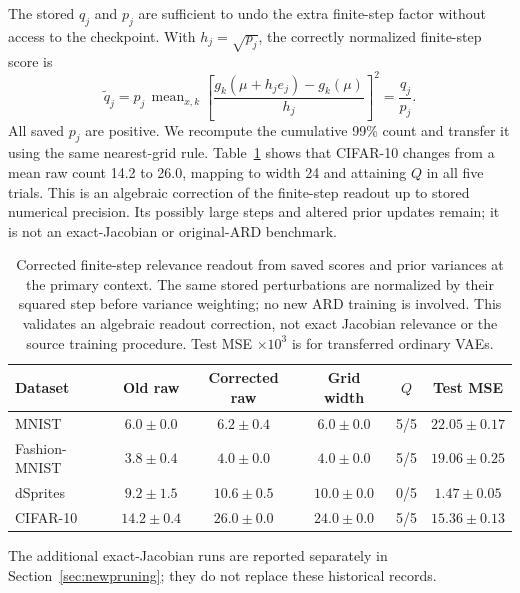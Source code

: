 \documentclass[make,article,submit,pdftex,moreauthors]{Definitions/mdpi}
\begin{document}
The stored $q_j$ and $p_j$ are sufficient to undo the extra finite-step
factor without access to the checkpoint. With $h_j=\sqrt{p_j}$, the
correctly normalized finite-step score is
\begin{equation}
 \widetilde q_j
 =p_j\,\operatorname{mean}_{x,k}
 \left[\frac{g_k(\mu+h_je_j)-g_k(\mu)}{h_j}\right]^2
 =\frac{q_j}{p_j}.
 \label{eq:ardcorrected}
\end{equation}
All saved $p_j$ are positive. We recompute the cumulative 99\% count
and transfer it using the same nearest-grid rule. Table~\ref{tab:ard_normalized}
shows that CIFAR-10 changes from a mean raw count 14.2 to 26.0,
mapping to width 24 and attaining $Q$ in all five trials. This is an
algebraic correction of the finite-step readout up to stored numerical
precision. Its
possibly large steps and altered prior updates remain; it is not
an exact-Jacobian or original-ARD benchmark.
\begin{table}[H]
\caption{Corrected finite-step relevance readout from saved scores and prior variances at the primary context. The same stored perturbations are normalized by their squared step before variance weighting; no new ARD training is involved. This validates an algebraic readout correction, not exact Jacobian relevance or the source training procedure. Test MSE $\times10^3$ is for transferred ordinary VAEs.}\label{tab:ard_normalized}
\small
\setlength{\tabcolsep}{3pt}
\begin{tabular*}{\textwidth}{@{\extracolsep{\fill}}lccccc@{}}
\toprule
Dataset & Old raw & Corrected raw & Grid width & $Q$ & Test MSE \\
\midrule
MNIST & $6.0 \pm 0.0$ & $6.2 \pm 0.4$ & $6.0 \pm 0.0$ & 5/5 & $22.05 \pm 0.17$ \\
Fashion-MNIST & $3.8 \pm 0.4$ & $4.0 \pm 0.0$ & $4.0 \pm 0.0$ & 5/5 & $19.06 \pm 0.25$ \\
dSprites & $9.2 \pm 1.5$ & $10.6 \pm 0.5$ & $10.0 \pm 0.0$ & 0/5 & $1.47 \pm 0.05$ \\
CIFAR-10 & $14.2 \pm 0.4$ & $26.0 \pm 0.0$ & $24.0 \pm 0.0$ & 5/5 & $15.36 \pm 0.13$ \\
\bottomrule\end{tabular*}
\end{table}


The additional exact-Jacobian runs are reported separately in
Section~\ref{sec:newpruning}; they do not replace these historical records.
\end{document}
